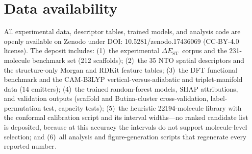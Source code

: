 \documentclass[twoside,onecolumn,9pt]{extarticle}
\newcommand{\deltaest}{$\Delta E_\text{ST}$}
\begin{document}
\section*{Data availability}
All experimental data, descriptor tables, trained models, and analysis code are
openly available on Zenodo under DOI: 10.5281/zenodo.17436069 (CC-BY-4.0 license).
The deposit includes: (1)~the experimental \deltaest\ corpus and the
\num{231}-molecule benchmark set (\num{212} scaffolds); (2)~the \num{35} NTO spatial
descriptors and the structure-only Morgan and RDKit feature tables; (3)~the DFT
functional benchmark and the CAM-B3LYP vertical-versus-adiabatic and triplet-manifold
data (\num{14} emitters); (4)~the trained random-forest models, SHAP attributions, and
validation outputs (scaffold and Butina-cluster cross-validation, label-permutation
test, capacity tests); (5)~the heuristic \num{22194}-molecule library with the
conformal calibration script and its interval widths---no ranked candidate list is
deposited, because at this accuracy the intervals do not support molecule-level
selection; and (6)~all analysis and figure-generation
scripts that regenerate every reported number.



\end{document}
